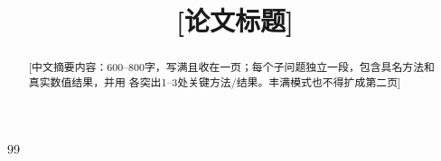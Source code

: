 \documentclass[bwprint]{gmcmthesis}
\title{[论文标题]}
\begin{document}
\maketitle

\begin{abstract}

[中文摘要内容：600--800字，写满且收在一页；每个子问题独立一段，包含具名方法和真实数值结果，并用 \textbf{} 各突出1--3处关键方法/结果。丰满模式也不得扩成第二页]

\keywords{[关键词1]\quad [关键词2]\quad [关键词3]}
\end{abstract}

\pagestyle{plain}

\clearpage
\clearpage











\begin{thebibliography}{99}
\end{thebibliography}

\begin{appendices}

\end{appendices}
\end{document}
